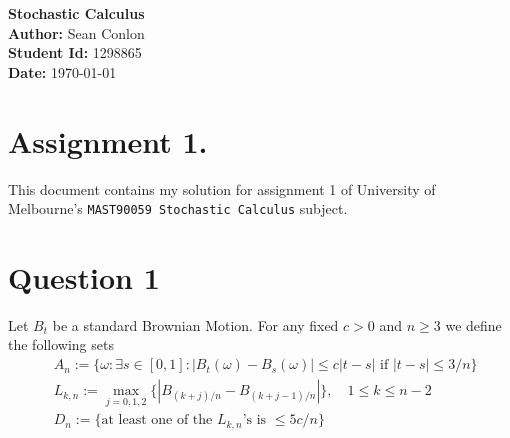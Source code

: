 \documentclass{article}
\begin{document}
\begin{titlepage}
    \centering
    {\Huge \textbf{Stochastic Calculus}}\\[1.5cm] %
    \textbf{Author:} Sean Conlon\\[1cm] %
    \textbf{Student Id:} 1298865\\[1cm]
    \textbf{Date:} \today\\[3cm] %
    
    \section*{Assignment 1.}
    This document contains my solution for assignment 1 of University of Melbourne's \texttt{MAST90059 Stochastic Calculus} subject.

    \tableofcontents
    
\end{titlepage}

\newpage
\section{Question 1}

\begin{tcolorbox}
[colframe=black,colback=gray!5,boxrule=0.5pt]
Let $B_t$ be a standard Brownian Motion. For any fixed $c > 0$ and $n\geq 3$ we define the following sets
\begin{align*}
    & A_n := \{\omega : \exists s\in[0,1] :|B_t(\omega) - B_s(\omega)|\leq c|t-s| \text{ if } |t-s|\leq 3/n\} \\
    & L_{k,n} := \max_{j=0,1,2} \{|B_{(k+j)/n} - B_{(k+j-1)/n}|\}, \quad 1\leq k\leq n-2 \\
    & D_n  := \{\text{at least one of the $L_{k,n}$'s is }\leq 5c/n\}
\end{align*}
\end{tcolorbox}
\end{document}
